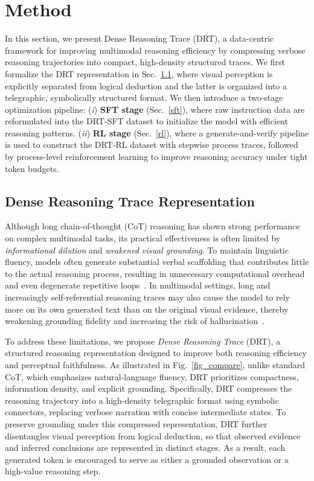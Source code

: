 \section{Method}
In this section, we present Dense Reasoning Trace (DRT), a data-centric framework for improving multimodal reasoning efficiency by compressing verbose reasoning trajectories into compact, high-density structured traces. We first formalize the DRT representation in Sec.~\ref{drt_define}, where visual perception is explicitly separated from logical deduction and the latter is organized into a telegraphic, symbolically structured format. We then introduce a two-stage optimization pipeline: 
(\textit{i}) \textbf{SFT stage} (Sec.~\ref{sft}), where raw instruction data are reformulated into the DRT-SFT dataset to initialize the model with efficient reasoning patterns.
(\textit{ii}) \textbf{RL stage} (Sec.~\ref{rl}), where a generate-and-verify pipeline is used to construct the DRT-RL dataset with stepwise process traces, followed by process-level reinforcement learning to improve reasoning accuracy under tight token budgets.

\subsection{Dense Reasoning Trace Representation}\label{drt_define}

Although long chain-of-thought (CoT) reasoning has shown strong performance on complex multimodal tasks, its practical effectiveness is often limited by \emph{informational dilution} and \emph{weakened visual grounding}. To maintain linguistic fluency, models often generate substantial verbal scaffolding that contributes little to the actual reasoning process, resulting in unnecessary computational overhead~\cite{li2025compressing,she2025hawkeye,choi-etal-2025-think} and even degenerate repetitive loops~\cite{NEURIPS2023_e6c2e85d,yao2025understanding}. In multimodal settings, long and increasingly self-referential reasoning traces may also cause the model to rely more on its own generated text than on the original visual evidence, thereby weakening grounding fidelity and increasing the risk of hallucination~\cite{huang2024opera}.

To address these limitations, we propose \emph{Dense Reasoning Trace} (DRT), a structured reasoning representation designed to improve both reasoning efficiency and perceptual faithfulness. As illustrated in Fig.~\ref{fig_compare}, unlike standard CoT, which emphasizes natural-language fluency, DRT prioritizes compactness, information density, and explicit grounding. Specifically, DRT compresses the reasoning trajectory into a high-density telegraphic format using symbolic connectors, replacing verbose narration with concise intermediate states. To preserve grounding under this compressed representation, DRT further disentangles visual perception from logical deduction, so that observed evidence and inferred conclusions are represented in distinct stages. As a result, each generated token is encouraged to serve as either a grounded observation or a high-value reasoning step.

